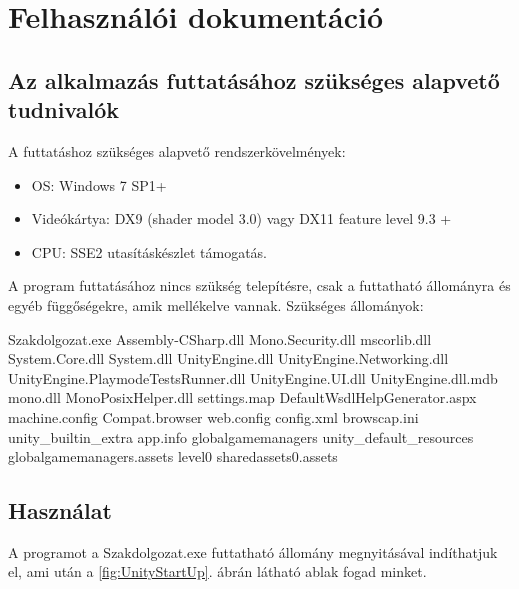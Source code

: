 \chapter*{Felhasználói dokumentáció}

\section*{Az alkalmazás futtatásához szükséges alapvető tudnivalók}

A futtatáshoz szükséges alapvető rendszerkövelmények:
\begin{itemize}
\item OS: Windows 7 SP1+
\item Videókártya: DX9 (shader model 3.0) vagy DX11 feature level 9.3 +
\item CPU: SSE2 utasításkészlet  támogatás.
\end{itemize}

\noindent A program futtatásához nincs szükség telepítésre, csak a futtatható állományra és egyéb függőségekre, amik mellékelve vannak.
\newline
\newline Szükséges állományok:
\begin{cpp}
Szakdolgozat.exe Assembly-CSharp.dll Mono.Security.dll mscorlib.dll
System.Core.dll System.dll UnityEngine.dll UnityEngine.Networking.dll
UnityEngine.PlaymodeTestsRunner.dll UnityEngine.UI.dll
UnityEngine.dll.mdb mono.dll MonoPosixHelper.dll settings.map
DefaultWsdlHelpGenerator.aspx machine.config Compat.browser
web.config config.xml browscap.ini  unity\_builtin\_extra app.info 
globalgamemanagers unity\_default\_resources
globalgamemanagers.assets level0 sharedassets0.assets
\end{cpp}

\section*{Használat}
A programot a Szakdolgozat.exe futtatható állomány megnyitásával indíthatjuk el, ami után a \ref{fig:UnityStartUp}. ábrán látható ablak fogad minket.

